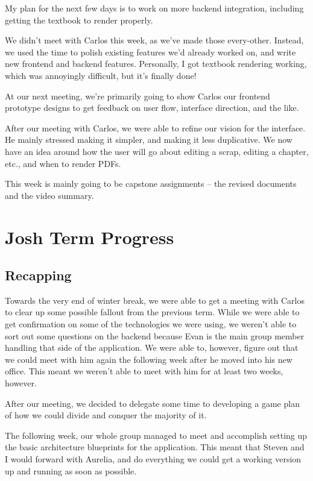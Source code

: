 \documentclass[onecolumn, draftclsnofoot,10pt, compsoc]{IEEEtran}
\begin{document}
My plan for the next few days is to work on more backend integration, 
including getting the textbook to render properly.

We didn't meet with Carlos this week, as we've made those every-other. 
Instead, we used the time to polish existing features we'd already worked on, 
and write new frontend and backend features. Personally, I got textbook 
rendering working, which was annoyingly difficult, but it's finally done!

At our next meeting, we're primarily going to show Carlos our frontend 
prototype designs to get feedback on user flow, interface direction, 
and the like.

After our meeting with Carlos, we were able to refine our vision for the 
interface. He mainly stressed making it simpler, and making it less duplicative. 
We now have an idea around how the user will go about editing a scrap, editing 
a chapter, etc., and when to render PDFs.

This week is mainly going to be capstone assignments -- the revised documents 
and the video summary.


\section{Josh Term Progress}
\subsection{Recapping}
Towards the very end of winter break, we were able to get a meeting with Carlos to clear 
up some possible fallout from the previous term. While we were able to get 
confirmation on some of the technologies we were using, we weren't able to sort out some 
questions on the backend because Evan is the main group member handling that side of the 
application. We were able to, however, figure out that we could meet with 
him again the following week after he moved into his new office. This meant we weren't 
able to meet with him for at least two weeks, however.

After our meeting, we decided to delegate some time to developing a game plan of how we 
could divide and conquer the majority of it.

The following week, our whole group managed to meet and accomplish setting up the basic
architecture blueprints for the application. This meant that Steven and I would forward 
with Aurelia, and do everything we could get a working version up and running as soon 
as possible.
\end{document}
